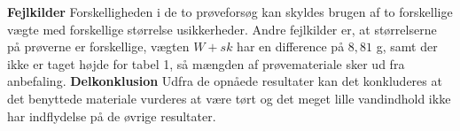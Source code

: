 \textbf{Fejlkilder}
\newline
Forskelligheden i de to prøveforsøg kan skyldes brugen af to forskellige vægte med forskellige størrelse usikkerheder. Andre fejlkilder er, at størrelserne på prøverne er forskellige, vægten $W+sk$ har en difference på $8,\!81$ g, samt der ikke er taget højde for tabel 1, så mængden af prøvemateriale sker ud fra anbefaling.
\newline
\newline
\textbf{Delkonklusion}
\newline
Udfra de opnåede resultater kan det konkluderes at det benyttede materiale vurderes at være tørt og det meget lille vandindhold ikke har indflydelse på de øvrige resultater.